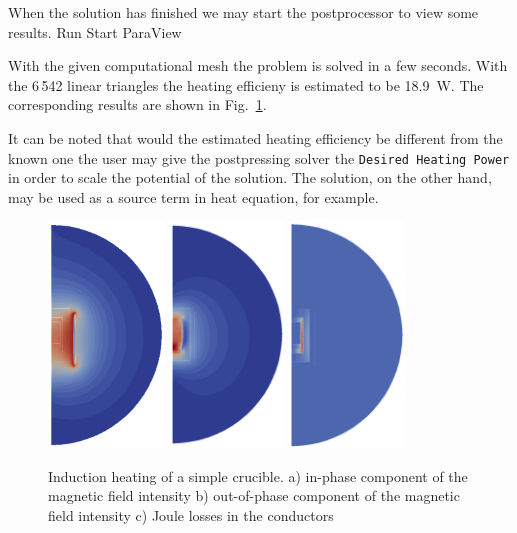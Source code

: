 When the solution has finished we may start the postprocessor to view some results.
\ttbegin
Run
  Start ParaView
\ttend


With the given computational mesh the problem is solved in 
a few seconds. With the 6\,542 linear triangles the heating
efficieny is estimated to be 18.9~W. The corresponding results are shown
in Fig.~\ref{fig:ind_heat1}.

It can be noted that would the estimated heating efficiency be different from the known one
the user may give the postpressing solver the \texttt{Desired Heating Power} in order to scale 
the potential of the solution. The solution, on the other hand, may be used as a source term 
in heat equation, for example. 

\begin{figure}
\begin{center}
  \includegraphics[height=60mm]{Induction_B_re}
  \includegraphics[height=60mm]{Induction_B_im}
  \includegraphics[height=60mm]{Induction_Joule_heating}


\end{center}
\caption{Induction heating of a simple crucible. 
a) in-phase component of the magnetic field intensity
b) out-of-phase component of the magnetic field intensity
c) Joule losses in the conductors}
\label{fig:ind_heat1}
\end{figure}

